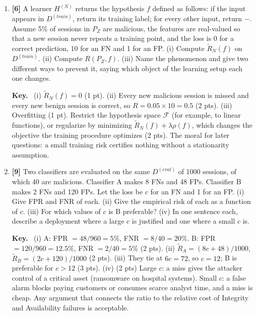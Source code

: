 \documentclass[10pt,a4paper]{extarticle}
\newcommand{\pts}[1]{\textbf{\color{accent}[#1]}\enspace}
\newenvironment{sol}{\par\smallskip
    \begin{tcolorbox}[colback=accent!6, colframe=accent, boxrule=0.5pt, arc=1pt,
                      left=5pt, right=5pt, top=2pt, bottom=2pt, breakable, fontupper=\small]
    \textbf{\color{accent}Key.}\ }{\end{tcolorbox}\par}
\begin{document}
\begin{enumerate}[label=(\alph*)]
\item \pts{6} A learner \(H^{(N)}\) returns the hypothesis \(f\) defined as follows: if the input appears in \(D^{(train)}\), return its training label; for every other input, return \(-\). Assume 5\% of sessions in \(P_Z\) are malicious, the features are real-valued so that a new session never repeats a training point, and the loss is 0 for a correct prediction, 10 for an FN and 1 for an FP. (i) Compute \(\tilde R_N(f)\) on \(D^{(train)}\). (ii) Compute \(R(P_Z,f)\). (iii) Name the phenomenon and give two different ways to prevent it, saying which object of the learning setup each one changes.

\begin{sol}
(i) \(\tilde R_N(f)=0\) (1 pt). (ii) Every new malicious session is missed and every new benign session is correct, so \(R=0.05\times 10=0.5\) (2 pts). (iii) Overfitting (1 pt). Restrict the hypothesis space \(\mathcal F\) (for example, to linear functions), or regularize by minimizing \(\tilde R_N(f)+\lambda\rho(f)\), which changes the objective the training procedure optimizes (2 pts). The moral for later questions: a small training risk certifies nothing without a stationarity assumption.
\end{sol}

\item \pts{9} Two classifiers are evaluated on the same \(D^{(eval)}\) of 1000 sessions, of which 40 are malicious. Classifier A makes 8 FNs and 48 FPs. Classifier B makes 2 FNs and 120 FPs. Let the loss be \(c\) for an FN and 1 for an FP. (i) Give FPR and FNR of each. (ii) Give the empirical risk of each as a function of \(c\). (iii) For which values of \(c\) is B preferable? (iv) In one sentence each, describe a deployment where a large \(c\) is justified and one where a small \(c\) is.

\begin{sol}
(i) A: FPR \(=48/960=5\%\), FNR \(=8/40=20\%\). B: FPR \(=120/960=12.5\%\), FNR \(=2/40=5\%\) (2 pts). (ii) \(\tilde R_A=(8c+48)/1000\), \(\tilde R_B=(2c+120)/1000\) (2 pts). (iii) They tie at \(6c=72\), so \(c=12\); B is preferable for \(c>12\) (3 pts). (iv) (2 pts) Large \(c\): a miss gives the attacker control of a critical asset (ransomware on hospital systems). Small \(c\): a false alarm blocks paying customers or consumes scarce analyst time, and a miss is cheap. Any argument that connects the ratio to the relative cost of Integrity and Availability failures is acceptable.
\end{sol}


\end{enumerate}
\end{document}
